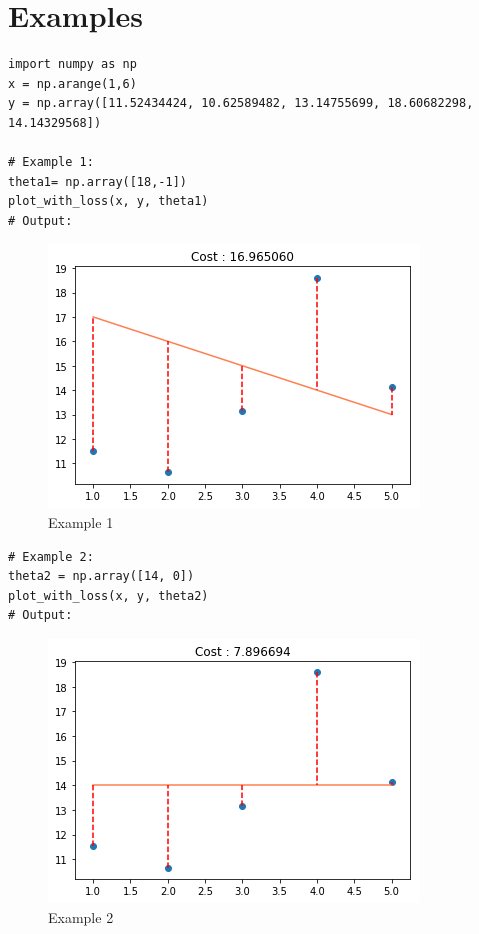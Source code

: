\documentclass{42-en}
\begin{document}
\newpage

\section*{Examples}
\begin{verbatim}
import numpy as np
x = np.arange(1,6)
y = np.array([11.52434424, 10.62589482, 13.14755699, 18.60682298, 14.14329568])

# Example 1:
theta1= np.array([18,-1])
plot_with_loss(x, y, theta1)
# Output:
\end{verbatim}

\begin{figure}[H]
  \centering
  \includegraphics[scale=0.65]{assets/plotcost1.png}
  \caption{Example 1}
\end{figure}

\begin{verbatim}
# Example 2:
theta2 = np.array([14, 0])
plot_with_loss(x, y, theta2)
# Output:
\end{verbatim}

\begin{figure}[H]
  \centering
  \includegraphics[scale=0.65]{assets/plotcost2.png}
  \caption{Example 2}
\end{figure}
\end{document}
